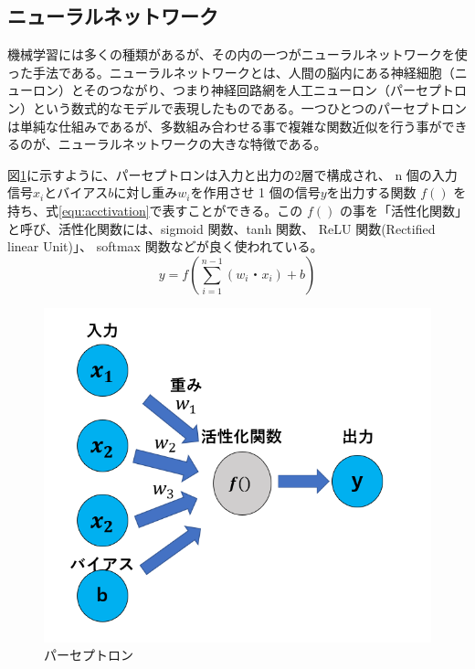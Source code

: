 \subsection{ニューラルネットワーク}
機械学習には多くの種類があるが、その内の一つがニューラルネットワークを使った手法である。ニューラルネットワークとは、人間の脳内にある神経細胞（ニューロン）とそのつながり、つまり神経回路網を人工ニューロン（パーセプトロン）という数式的なモデルで表現したものである。一つひとつのパーセプトロンは単純な仕組みであるが、多数組み合わせる事で複雑な関数近似を行う事ができるのが、ニューラルネットワークの大きな特徴である。

図\ref{fig:perce}に示すように、パーセプトロンは入力と出力の2層で構成され、 n 個の入力信号$x_i$とバイアス$b$に対し重み$w_i$を作用させ 1 個の信号$y$を出力する関数 $f( )$ を持ち、式\ref{equ:acctivation}で表すことができる。この $f( )$ の事を「活性化関数」と呼び、活性化関数には、sigmoid 関数、tanh 関数、 ReLU 関数(Rectified linear Unit)」、 softmax 関数などが良く使われている。 
\begin{equation}
    y = f(\sum^{n-1}_{i=1}(w_i・x_i) + b)
    \label{equ:acctivation}
\end{equation}
\begin{figure}[tb]
  \centering
  \includegraphics[clip, width=13cm]{fig/4/parceptron.png}
  \caption{パーセプトロン}
  \label{fig:perce}
\end{figure}

